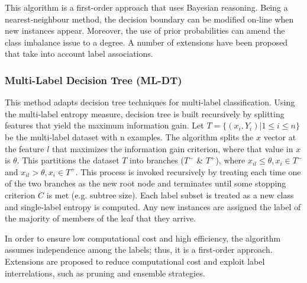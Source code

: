 \documentclass[12pt]{report}
\begin{document}
	This algorithm is a first-order approach that uses Bayesian reasoning. Being a
  nearest-neighbour method, the decision boundary can be modified on-line when
  new instances appear. Moreover, the use of prior probabilities can amend the
  class imbalance issue to a degree. A number of extensions have been proposed that take into account label associations.
	
	\subsubsection*{Multi-Label Decision Tree (ML-DT)}
	This method adapts decision tree techniques for multi-label classification.
  Using the multi-label entropy measure, decision tree is built recursively by
  splitting features that yield the maximum information gain. Let $T = \{(x_i,
  Y_i) | 1 \leq i \leq n \}$ be the multi-label dataset with n examples. The
  algorithm splits the $x$ vector at the feature $l$ that maximizes the
  information gain criterion, where that value in $x$ is  $\theta$. This
  partitions the dataset $T$ into branches ($T^-$ \& $T^+$), where $x_{il} \leq
  \theta, x_i \in T^-$ and $x_{il} > \theta, x_i \in T^+$. This process is
  invoked recursively by treating each time one of the two branches as the new
  root node and terminates until some stopping criterion $C$ is met (e.g.
  subtree size). Each label subset is treated as a new class and single-label entropy is computed. Any new instances are assigned the label of the majority of members of the leaf that they arrive.
	
	In order to ensure low computational cost and high efficiency, the algorithm
  assumes independence among the labels; thus, it is a first-order approach.
  Extensions are proposed to reduce computational cost and exploit label interrelations, such as pruning and ensemble strategies.
	
\end{document}
